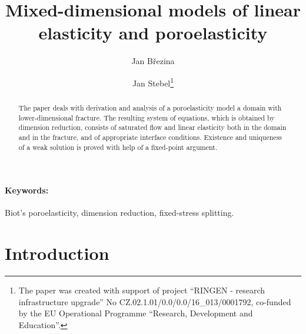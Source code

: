 \documentclass[a4paper]{article}
\begin{document}
\title{Mixed-dimensional models of linear elasticity and poroelasticity}
\author{Jan Březina}
\author{Jan Stebel\thanks{The paper was created with support of project ``RINGEN - research
infrastructure upgrade'' No CZ.02.1.01/0.0/0.0/16\_013/0001792,
co-funded by the EU Operational Programme ``Research, Development and Education''.}}
\maketitle

\begin{abstract}
The paper deals with derivation and analysis of a poroelasticity model a domain with lower-dimensional fracture.
The resulting system of equations, which is obtained by dimension reduction, consists of saturated flow and linear elasticity both in the domain and in the fracture, and of appropriate interface conditions.
Existence and uniqueness of a weak solution is proved with help of a fixed-point argument.
\end{abstract}

\paragraph{Keywords:}
Biot's poroelasticity, dimension reduction, fixed-stress splitting.


\section{Introduction}

\end{document}
